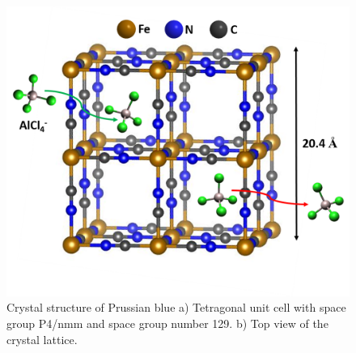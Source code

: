  \begin{figure}[tbh!]
  \centering
  \includegraphics[width=\textwidth]{Figures/chap6fig/pbcrys}
    \caption{Crystal structure of Prussian blue a) Tetragonal unit cell with space group P4/nmm and space group number 129. b) Top view of the crystal lattice.}
  \label{Figures/chap6fig:pbcrys}
\end{figure}

